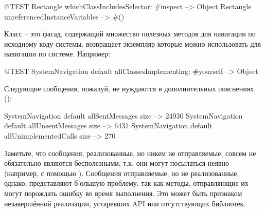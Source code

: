 \documentclass[a4paper,10pt,twoside]{book}
\begin{document}
\begin{code}{@TEST}
Rectangle whichClassIncludesSelector: #inspect --> Object
Rectangle unreferencedInstanceVariables            --> #()
\end{code}

Класс  -- это фасад, содержащий множество полезных методов для навигации по исходному коду системы.
  возвращает экземпляр которые можно использовать для навигации по системе.
Например:

\begin{code}{@TEST}
SystemNavigation default allClassesImplementing: #yourself --> {Object}
\end{code}

Следующие сообщения, пожалуй, не нуждаются в дополнительных пояснениях ():

\begin{code}{}
SystemNavigation default allSentMessages size          --> 24930
SystemNavigation default allUnsentMessages size      --> 6431
SystemNavigation default allUnimplementedCalls size --> 270
\end{code}

Заметьте, что сообщения, реализованные, но никем не отправляемые, совсем не обязательно являются бесполезными, т.к. они могут посылаться неявно (например, с помощью ).
Сообщения отправляемые, но не реализованные, однако, представляют б'ольшую проблему, так как методы, отправляющие их могут порождать ошибку во время выполнения.
Это может быть признаком незавершённой реализации, устаревших API или отсутствующих библиотек.
\end{document}
